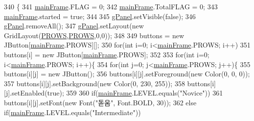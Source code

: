 \begin{DoxyCode}
340                          \{
341         \hyperlink{classpkg_1_1main_frame_a0edb10d75697656c940f3b5e3ba7d9ef}{mainFrame}.FLAG = 0;
342         \hyperlink{classpkg_1_1main_frame_a0edb10d75697656c940f3b5e3ba7d9ef}{mainFrame}.TotalFLAG = 0;
343         \hyperlink{classpkg_1_1main_frame_a0edb10d75697656c940f3b5e3ba7d9ef}{mainFrame}.started = \textcolor{keyword}{true};
344         
345         \hyperlink{classpkg_1_1main_frame_a17ea45ba089445a24b9da9bf561f6603}{gPanel}.setVisible(\textcolor{keyword}{false});
346         \hyperlink{classpkg_1_1main_frame_a17ea45ba089445a24b9da9bf561f6603}{gPanel}.removeAll();
347         \hyperlink{classpkg_1_1main_frame_a17ea45ba089445a24b9da9bf561f6603}{gPanel}.setLayout(\textcolor{keyword}{new} GridLayout(\hyperlink{classpkg_1_1main_frame_a6d9a76db81895214a2acaab598dc2a7c}{PROWS},\hyperlink{classpkg_1_1main_frame_a6d9a76db81895214a2acaab598dc2a7c}{PROWS},0,0));
348         
349         buttons = \textcolor{keyword}{new} JButton[\hyperlink{classpkg_1_1main_frame_a0edb10d75697656c940f3b5e3ba7d9ef}{mainFrame}.PROWS][];
350         \textcolor{keywordflow}{for}(\textcolor{keywordtype}{int} i=0; i<\hyperlink{classpkg_1_1main_frame_a0edb10d75697656c940f3b5e3ba7d9ef}{mainFrame}.PROWS; i++)
351             buttons[i] = \textcolor{keyword}{new} JButton[\hyperlink{classpkg_1_1main_frame_a0edb10d75697656c940f3b5e3ba7d9ef}{mainFrame}.PROWS];
352         
353         \textcolor{keywordflow}{for}(\textcolor{keywordtype}{int} i=0; i<\hyperlink{classpkg_1_1main_frame_a0edb10d75697656c940f3b5e3ba7d9ef}{mainFrame}.PROWS; i++)\{
354             \textcolor{keywordflow}{for}(\textcolor{keywordtype}{int} j=0; j<\hyperlink{classpkg_1_1main_frame_a0edb10d75697656c940f3b5e3ba7d9ef}{mainFrame}.PROWS; j++)\{
355                 buttons[i][j] = \textcolor{keyword}{new} JButton();
356                 buttons[i][j].setForeground(\textcolor{keyword}{new} Color(0, 0, 0));
357                 buttons[i][j].setBackground(\textcolor{keyword}{new} Color(0, 230, 255));
358                 buttons[i][j].setEnabled(\textcolor{keyword}{true});
359                 
360                 \textcolor{keywordflow}{if}(\hyperlink{classpkg_1_1main_frame_a0edb10d75697656c940f3b5e3ba7d9ef}{mainFrame}.LEVEL.equals(\textcolor{stringliteral}{"Novice"}))
361                     buttons[i][j].setFont(\textcolor{keyword}{new} Font(\textcolor{stringliteral}{"돋움"}, Font.BOLD, 30));
362                 \textcolor{keywordflow}{else} \textcolor{keywordflow}{if}(\hyperlink{classpkg_1_1main_frame_a0edb10d75697656c940f3b5e3ba7d9ef}{mainFrame}.LEVEL.equals(\textcolor{stringliteral}{"Intermediate"}))

\end{DoxyCode}
